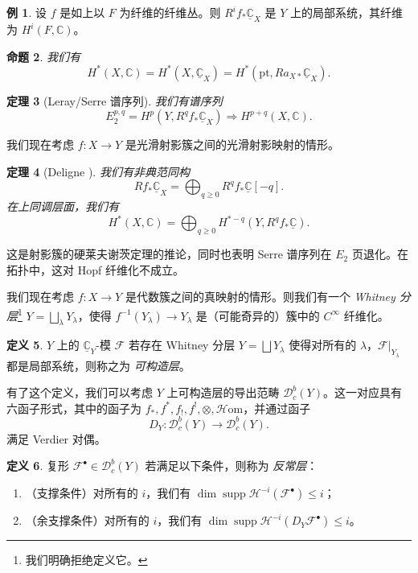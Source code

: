 \documentclass{amsart}
\newtheorem{thm}{定理}[section]
\newtheorem{prop}[thm]{命题}
\theoremstyle{definition}
\newtheorem{defn}[thm]{定义}
\newtheorem{exm}[thm]{例}
\theoremstyle{remark}
\theoremstyle{plain}
\theoremstyle{definition}
\theoremstyle{remark}
\newcommand{\C}{\mathbb{C}}
\newcommand{\mc}[1]{\mathcal{#1}}
\newcommand{\mr}[1]{\mathrm{#1}}
\newcommand{\on}[1]{\operatorname{#1}}
\newcommand{\ul}[1]{\underline{#1}}
\newcommand{\1}{\mathbf{1}}
\newcommand{\2}{\mathbf{2}}
\newcommand{\3}{\mathbf{3}}
\begin{document}
\begin{exm}
    设 \(f\) 是如上以 \(F\) 为纤维的纤维丛。则 \(R^i f_* \ul{\C}_X\) 是 \(Y\) 上的局部系统，其纤维为 \(H^i(F, \C)\)。
\end{exm}

\begin{prop}
    我们有
    \[ H^*(X, \C) = H^*(X, \ul{\C}_X) = H^*(\mr{pt}, R a_{X*} \ul{\C}_X). \]
\end{prop}

\begin{thm}[Leray/Serre 谱序列]
    我们有谱序列
    \[ E_2^{p,q} = H^p(Y, R^q f_* \ul{\C}_X) \Rightarrow H^{p+q}(X, \C). \]
\end{thm}

我们现在考虑 \(f \colon X \to Y\) 是光滑射影簇之间的光滑射影映射的情形。

\begin{thm}[Deligne {\cite{Deligne1968}}]
    我们有非典范同构
    \[ R f_* \ul{\C}_X = \bigoplus_{q \geq 0} R^q f_* \ul{\C}[-q]. \]
    在上同调层面，我们有
    \[ H^*(X, \C) = \bigoplus_{q \geq 0} H^{*-q}(Y, R^q f_* \ul{\C}). \]
\end{thm}

这是射影簇的硬莱夫谢茨定理的推论，同时也表明 Serre 谱序列在 \(E_2\) 页退化。在拓扑中，这对 Hopf 纤维化不成立。

我们现在考虑 \(f \colon X \to Y\) 是代数簇之间的真映射的情形。则我们有一个 \textit{Whitney 分层}\footnote{我们明确拒绝定义它。} \(Y = \bigsqcup_{\lambda} Y_{\lambda}\)，使得 \(f^{-1}(Y_{\lambda}) \to Y_{\lambda}\) 是（可能奇异的）簇中的 \(C^{\infty}\) 纤维化。

\begin{defn}
    \(Y\) 上的 \(\ul{\C}_Y\)-模 \(\mc{F}\) 若存在 Whitney 分层 \(Y = \bigsqcup Y_{\lambda}\) 使得对所有的 \(\lambda\)，\(\mc{F}|_{Y_{\lambda}}\) 都是局部系统，则称之为 \textit{可构造层}。
\end{defn}

有了这个定义，我们可以考虑 \(Y\) 上可构造层的导出范畴 \(\mc{D}_c^b(Y)\)。这一对应具有六函子形式，其中的函子为 \(f_*, f^*, f_!, f^!, \otimes, \mc{H}\mr{om}\)，并通过函子
\[ D_Y \colon \mc{D}_c^b(Y) \to \mc{D}_c^b(Y). \]
满足 Verdier 对偶。

\begin{defn}
    复形 \(\mc{F}^{\bullet} \in \mc{D}_c^b(Y)\) 若满足以下条件，则称为 \textit{反常层}：
    \begin{enumerate}
        \item （支撑条件）对所有的 \(i\)，我们有 \(\dim \on{supp} \mc{H}^{-i}(\mc{F}^{\bullet}) \leq i\)；
        \item （余支撑条件）对所有的 \(i\)，我们有 \(\dim \on{supp} \mc{H}^{-i}(D_Y \mc{F}^{\bullet}) \leq i\)。
    \end{enumerate}
\end{defn}
\end{document}
